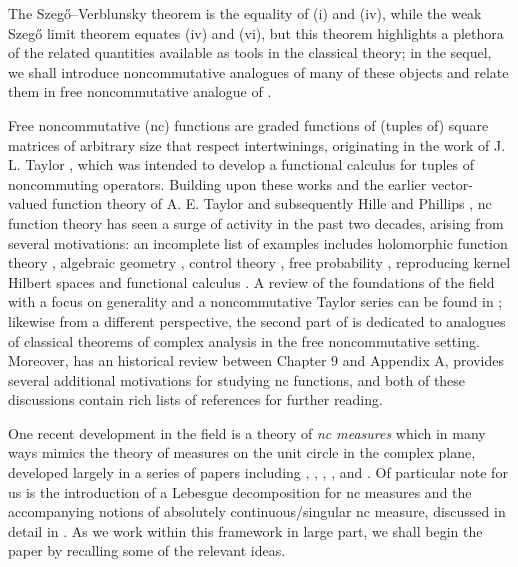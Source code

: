 \documentclass[11pt,reqno]{amsart}
\theoremstyle{definition}
\numberwithin{equation}{section}
\begin{document}
The Szeg\H{o}--Verblunsky theorem is the equality of (i) and (iv), while the weak Szeg\H{o} limit theorem equates (iv) and (vi), but this theorem highlights a plethora of the related quantities available as tools in the classical theory; in the sequel, we shall introduce noncommutative analogues of many of these objects and relate them in free noncommutative analogue of .

Free noncommutative (nc) functions are graded functions of (tuples of) square matrices of arbitrary size that respect intertwinings, originating in the work of J. L. Taylor \cite{Tay72}, \cite{Tay73} which was intended to develop a functional calculus for tuples of noncommuting operators. Building upon these works and the earlier vector-valued function theory of A. E. Taylor \cite{Tay37} and subsequently Hille and Phillips \cite[Chapter XXVI]{HP57}, nc function theory has seen a surge of activity in the past two decades, arising from several motivations: an incomplete list of examples includes holomorphic function theory \cite{Pop06b}, algebraic geometry \cite{Hel02}, control theory \cite{HMPV09}, free probability \cite{Voi10}, reproducing kernel Hilbert spaces \cite{BMV16} and functional calculus \cite{AMY20}. A review of the foundations of the field with a focus on generality and a noncommutative Taylor series can be found in \cite{KVV14}; likewise from a different perspective, the second part of \cite{AMY20} is dedicated to analogues of classical theorems of complex analysis in the free noncommutative setting. Moreover, \cite{KVV14} has an historical review between Chapter 9 and Appendix A, \cite[Chapter 11]{AMY20} provides several additional motivations for studying nc functions, and both of these discussions contain rich lists of references for further reading.

One recent development in the field is a theory of \emph{nc measures} which in many ways mimics the theory of measures on the unit circle in the complex plane, developed largely in a series of papers including \cite{JM17}, \cite{JM20}, \cite{JM22a}, \cite{JM22b}, and \cite{JM23}. Of particular note for us is the introduction of a Lebesgue decomposition for nc measures and the accompanying notions of absolutely continuous/singular nc measure, discussed in detail in \cite{JM22b}. As we work within this framework in large part, we shall begin the paper by recalling some of the relevant ideas.
\end{document}

